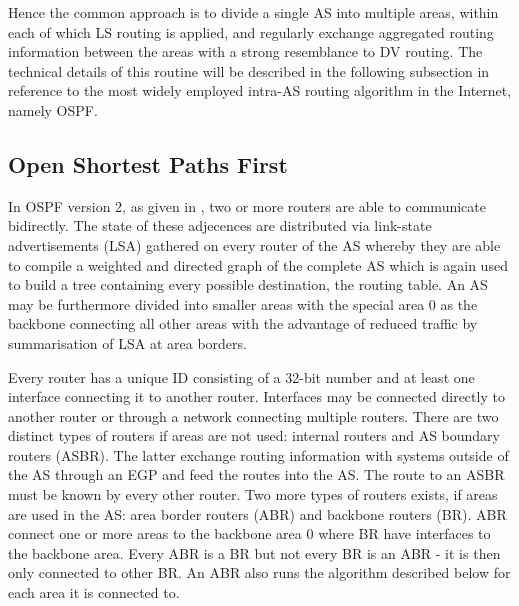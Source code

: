 \documentclass{acm_proc_article-sp}
\begin{document}
Hence the common approach is to divide a single AS into multiple areas, within each of which LS routing is applied, and regularly exchange aggregated routing information between the areas with a strong resemblance to DV routing. The technical details of this routine will be described in the following subsection in reference to the most widely employed intra-AS routing algorithm in the Internet, namely OSPF.

\subsection{Open Shortest Paths First}

In OSPF version 2, as given in \cite{RFC1247}, two or more routers are able to communicate bidirectly. The state of these adjecences are distributed via link-state advertisements (LSA) gathered on every router of the AS whereby they are able to compile a weighted and directed graph of the complete AS which is again used to build a tree containing every possible destination, the routing table. An AS may be furthermore divided into smaller areas with the special area 0 as the backbone connecting all other areas with the advantage of reduced traffic by summarisation of LSA at area borders.

Every router has a unique ID consisting of a 32-bit number and at least one interface connecting it to another router. Interfaces may be connected directly to another router or through a network connecting multiple routers. There are two distinct types of routers if areas are not used: internal routers and AS boundary routers (ASBR). The latter exchange routing information with systems outside of the AS through an EGP and feed the routes into the AS. The route to an ASBR must be known by every other router. Two more types of routers exists, if areas are used in the AS: area border routers (ABR) and backbone routers (BR). ABR connect one or more areas to the backbone area 0 where BR have interfaces to the backbone area. Every ABR is a BR but not every BR is an ABR - it is then only connected to other BR. An ABR also runs the algorithm described below for each area it is connected to.
\end{document}
